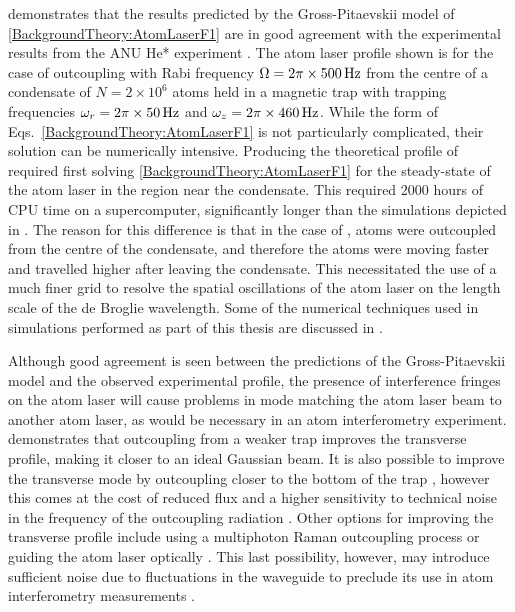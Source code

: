  demonstrates that the results predicted by the Gross-Pitaevskii model of \eqref{BackgroundTheory:AtomLaserF1} are in good agreement with the experimental results from the ANU He* experiment \citep{Dall:2007}.  The atom laser profile shown is for the case of outcoupling with Rabi frequency $\Omega = 2\pi\times \unit[500]{Hz}$ from the centre of a condensate of $N=2 \times 10^6$ atoms held in a magnetic trap with trapping frequencies $\omega_r = 2\pi \times \unit[50]{Hz}$ and $\omega_z = 2 \pi \times \unit[460]{Hz}$.  While the form of Eqs.~\eqref{BackgroundTheory:AtomLaserF1} is not particularly complicated, their solution can be numerically intensive.  Producing the theoretical profile of  required first solving \eqref{BackgroundTheory:AtomLaserF1} for the steady-state of the atom laser in the region near the condensate.  This  required 2000 hours of CPU time on a supercomputer, significantly longer than the simulations depicted in .  The reason for this difference is that in the case of , atoms were outcoupled from the centre of the condensate, and therefore the atoms were moving faster and travelled higher after leaving the condensate.  This necessitated the use of a much finer grid to resolve the spatial oscillations of the atom laser on the length scale of the de Broglie wavelength.  Some of the numerical techniques used in simulations performed as part of this thesis are discussed in .

Although good agreement is seen between the predictions of the Gross-Pitaevskii model and the observed experimental profile, the presence of interference fringes on the atom laser will cause problems in mode matching the atom laser beam to another atom laser, as would be necessary in an atom interferometry experiment.   demonstrates that outcoupling from a weaker trap improves the transverse profile, making it closer to an ideal Gaussian beam.  It is also possible to improve the transverse mode by outcoupling closer to the bottom of the trap \citep{Riou:2006fk}, however this comes at the cost of reduced flux and a higher sensitivity to technical noise in the frequency of the outcoupling radiation \citep{Robins:2005uq}.  Other options for improving the transverse profile include using a multiphoton Raman outcoupling process \citep{Hagley:1999dz,Ruostekoski:2003,Jeppesen:2008} or guiding the atom laser optically \citep{Guerin:2006mz,Couvert:2008,Dall:2010}.  This last possibility, however, may introduce sufficient noise due to fluctuations in the waveguide to preclude its use in atom interferometry measurements \citep{Le-Coq:2006}.

